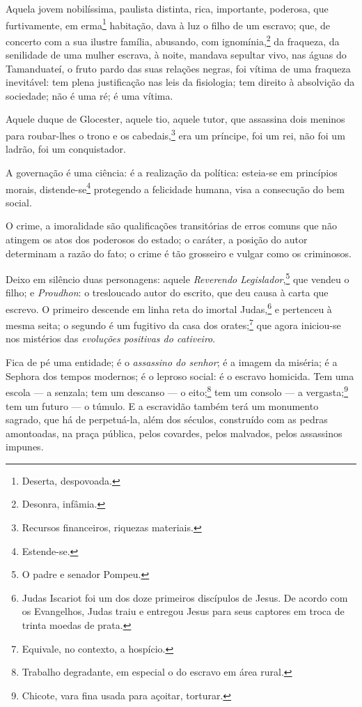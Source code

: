 Aquela jovem nobilíssima, paulista distinta, rica, importante, poderosa,
que furtivamente, em erma\footnote{Deserta, despovoada.} habitação,
dava à luz o filho de um escravo; que, de concerto com a sua ilustre
família, abusando, com ignomínia,\footnote{Desonra, infâmia.} da
fraqueza, da senilidade de uma mulher escrava, à noite, mandava sepultar
vivo, nas águas do Tamanduateí, o fruto pardo das suas relações negras,
foi vítima de uma fraqueza inevitável: tem plena justificação nas leis
da fisiologia; tem direito à absolvição da sociedade; não é uma ré; é
uma vítima.

Aquele duque de Glocester, aquele tio, aquele tutor, que assassina dois
meninos para roubar-lhes o trono e os cabedais,\footnote{Recursos
  financeiros, riquezas materiais.} era um príncipe, foi um rei, não
foi um ladrão, foi um conquistador.

A governação é uma ciência: é a realização da política: esteia-se em
princípios morais, distende-se\footnote{Estende-se.} protegendo a
felicidade humana, visa a consecução do bem social.

O crime, a imoralidade são qualificações transitórias de erros comuns
que não atingem os atos dos poderosos do estado; o caráter, a posição do
autor determinam a razão do fato; o crime é tão grosseiro e vulgar como
os criminosos.

\asterisc

Deixo em silêncio duas personagens: aquele \emph{Reverendo
Legislador},\footnote{O padre e senador Pompeu.} que vendeu o filho; e
\emph{Proudhon}: o tresloucado autor do escrito, que deu causa à carta
que escrevo. O primeiro descende em linha reta do imortal
Judas,\footnote{Judas Iscariot foi um dos doze primeiros discípulos de \label{judas}
  Jesus. De acordo com os Evangelhos, Judas traiu e entregou Jesus para
  seus captores em troca de trinta moedas de prata.} e pertenceu à
mesma seita; o segundo é um fugitivo da casa dos orates;\footnote{
  Equivale, no contexto, a hospício.} que agora iniciou-se nos
mistérios das \emph{evoluções positivas do cativeiro}.

Fica de pé uma entidade; é o \emph{assassino do senhor}; é a imagem da
miséria; é a Sephora dos tempos modernos; é o leproso social: é o
escravo homicida. Tem uma escola --- a senzala; tem um descanso --- o
eito;\footnote{Trabalho degradante, em especial o do
  escravo em área rural.} tem um consolo --- a vergasta;\footnote{
  Chicote, vara fina usada para açoitar, torturar.}
tem um futuro --- o
túmulo. E a escravidão também terá um monumento sagrado, que há de
perpetuá-la, além dos séculos, construído com as pedras amontoadas, na
praça pública, pelos covardes, pelos malvados, pelos assassinos impunes.

